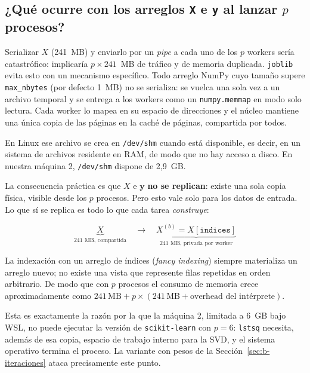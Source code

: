 \documentclass[11pt,letterpaper]{article}
\begin{document}
\subsection{¿Qué ocurre con los arreglos \texttt{X} e \texttt{y} al lanzar $p$ procesos?}

Serializar $X$ (241~MB) y enviarlo por un \textit{pipe} a cada uno de los $p$ workers
sería catastrófico: implicaría $p \times 241$~MB de tráfico y de memoria duplicada.
\texttt{joblib} evita esto con un mecanismo específico. Todo arreglo NumPy cuyo tamaño
supere \texttt{max\_nbytes} (por defecto 1~MB) no se serializa: se vuelca una sola vez a
un archivo temporal y se entrega a los workers como un \texttt{numpy.memmap} en modo
solo lectura. Cada worker lo mapea en su espacio de direcciones y el núcleo mantiene una
única copia de las páginas en la caché de páginas, compartida por todos.

En Linux ese archivo se crea en \texttt{/dev/shm} cuando está disponible, es decir, en
un sistema de archivos residente en RAM, de modo que no hay acceso a disco. En nuestra
máquina 2, \texttt{/dev/shm} dispone de 2{,}9~GB.

La consecuencia práctica es que $X$ e $\mathbf{y}$ \textbf{no se replican}: existe una
sola copia física, visible desde los $p$ procesos. Pero esto vale solo para los datos de
entrada. Lo que sí se replica es todo lo que cada tarea \emph{construye}:

\begin{equation}
\underbrace{X}_{\text{241 MB, compartida}}
\quad\longrightarrow\quad
\underbrace{X^{(b)} = X[\texttt{indices}]}_{\text{241 MB, privada por worker}}
\end{equation}

La indexación con un arreglo de índices (\textit{fancy indexing}) siempre materializa un
arreglo nuevo; no existe una vista que represente filas repetidas en orden arbitrario.
De modo que con $p$ procesos el consumo de memoria crece aproximadamente como
$241\,\text{MB} + p \times (241\,\text{MB} + \text{overhead del intérprete})$.

Esta es exactamente la razón por la que la máquina 2, limitada a 6~GB bajo WSL, no puede
ejecutar la versión de \texttt{scikit-learn} con $p = 6$: \texttt{lstsq} necesita, además
de esa copia, espacio de trabajo interno para la SVD, y el sistema operativo termina el
proceso. La variante con pesos de la Sección~\ref{sec:b-iteraciones} ataca precisamente
este punto.

\end{document}
